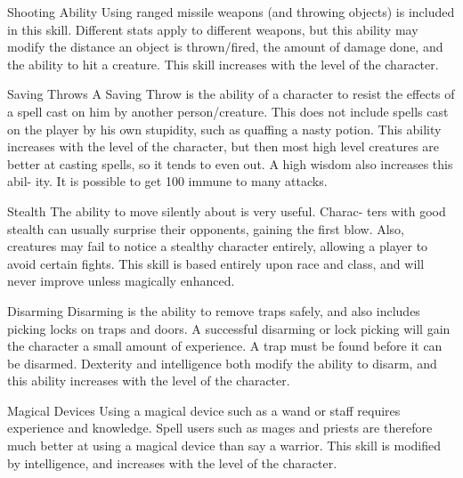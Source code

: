           Shooting Ability
               Using ranged missile weapons (and throwing objects) is
               included in this skill. Different stats apply to different
               weapons, but this ability may modify the distance an object
               is thrown/fired, the amount of damage done, and the ability
               to hit a creature. This skill increases with the level of
               the character.
 
          Saving Throws
               A Saving Throw is the ability of a character to resist the
               effects of a spell cast on him by another person/creature.
               This does not include spells cast on the player by his own
               stupidity, such as quaffing a nasty potion. This ability
               increases with the level of the character, but then most
               high level creatures are better at casting spells, so it
               tends to even out. A high wisdom also increases this abil-
               ity. It is possible to get 100%
               immune to many attacks.
 
          Stealth
               The ability to move silently about is very useful. Charac-
               ters with good stealth can usually surprise their opponents,
               gaining the first blow. Also, creatures may fail to notice
               a stealthy character entirely, allowing a player to avoid
               certain fights. This skill is based entirely upon race and
               class, and will never improve unless magically enhanced.
 
          Disarming
               Disarming is the ability to remove traps safely, and also
               includes picking locks on traps and doors. A successful
               disarming or lock picking will gain the character a small
               amount of experience. A trap must be found before it can
               be disarmed. Dexterity and intelligence both modify the
               ability to disarm, and this ability increases with the
               level of the character.
 
          Magical Devices
               Using a magical device such as a wand or staff requires
               experience and knowledge. Spell users such as mages and
               priests are therefore much better at using a magical device
               than say a warrior. This skill is modified by intelligence,
               and increases with the level of the character.

